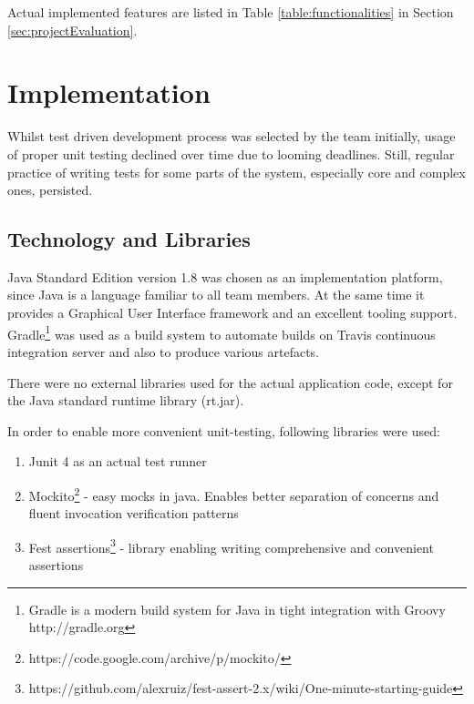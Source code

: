 Actual implemented features are listed in Table \ref{table:functionalities} in Section \ref{sec:projectEvaluation}.

\section{Implementation}

Whilst test driven development process was selected by the team initially, usage of proper unit testing declined over time due to looming deadlines. Still, regular practice of writing tests for some parts of the system, especially core and complex ones, persisted.

\subsection{Technology and Libraries}

Java Standard Edition version 1.8 was chosen as an implementation platform, since Java is a language familiar to all team members. At the same time it provides a Graphical User Interface framework and an excellent tooling support. Gradle\footnote{Gradle is a modern build system for Java in tight integration with Groovy http://gradle.org} was used as a build system to automate builds on Travis continuous integration server and also to produce various artefacts.

There were no external libraries used for the actual application code, except for the Java standard runtime library (rt.jar).

In order to enable more convenient unit-testing, following libraries were used:
\begin{enumerate}
    \item Junit 4 as an actual test runner
    \item Mockito\footnote{https://code.google.com/archive/p/mockito/} - easy mocks in java. Enables better separation of concerns and fluent invocation verification patterns
    \item Fest assertions\footnote{https://github.com/alexruiz/fest-assert-2.x/wiki/One-minute-starting-guide} - library enabling writing comprehensive and convenient assertions
\end{enumerate}

